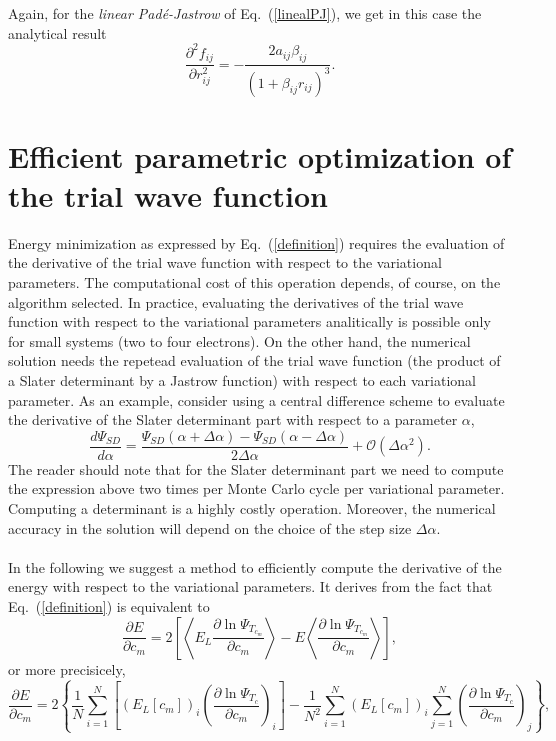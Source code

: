 Again, for the \emph{linear Pad\'e-Jastrow} of Eq.~(\ref{linealPJ}), we get in this case the analytical result
\begin{equation}\label{analyticalLinearPJLap}
\boxed{\frac{\partial^2 f_{ij}}{\partial r_{ij}^2} = - \frac{2 a_{ij} \beta_{ij} }{(1 + \beta_{ij} r_{ij})^3}}.
\end{equation}


\section{Efficient parametric optimization of the trial wave function}\label{effParamDer}

Energy minimization as expressed by Eq.~(\ref{definition}) requires the evaluation of the derivative of the trial wave function with respect to the variational parameters. The computational cost of this operation depends, of course, on the algorithm selected. In practice, evaluating the derivatives of the trial wave function with respect to the variational parameters analitically is possible only for small systems (two to four electrons). On the other hand, the numerical solution needs the repetead evaluation of the trial wave function (the product of a Slater determinant by a Jastrow function) with respect to each variational parameter. As an example, consider using a central difference scheme to evaluate the derivative of the Slater determinant part with respect to a parameter $\alpha$, 
$$\frac{d \Psi_{SD}}{d \alpha} = \frac{\Psi_{SD}(\alpha + \Delta \alpha) - \Psi_{SD}(\alpha - \Delta \alpha)}{2\Delta \alpha} + \mathcal{O}(\Delta \alpha^2).$$
The reader should note that for the Slater determinant part we need to compute the expression above two times per Monte Carlo cycle per variational parameter. Computing a determinant is a highly costly operation. Moreover, the numerical accuracy in the solution will depend on the choice of the step size $\Delta \alpha$.\\
\\
\noindent
In the following we suggest a method to efficiently compute the derivative of the energy with respect to the variational parameters. It derives from the fact that Eq.~(\ref{definition}) is equivalent to
$$
 \frac{\partial E}{\partial c_m} = 2\left[\left\langle E_L \frac{\partial \ln \Psi_{T_{c_m}}}{\partial c_m}\right\rangle - E \left\langle \frac{\partial \ln \Psi_{T_{c_m}}}{\partial c_m}\right\rangle \right],
$$
or more precisicely,
\begin{equation}
\boxed{\frac{\partial E}{\partial c_m}\! =\! 2\left\{\!\frac{1}{N} \sum_{i=1}^{N} \left[(E_L[c_m])_i \left(\frac{\partial \ln \Psi_{T_{c}}}{\partial c_m}\right)_i\right]\! -\! \frac{1}{N^2} \sum_{i=1}^{N} (E_L[c_m])_i \sum_{j=1}^{N} \left(\frac{\partial \ln \Psi_{T_{c}}}{\partial c_m}\right)_j\right\}\!},
\end{equation}
